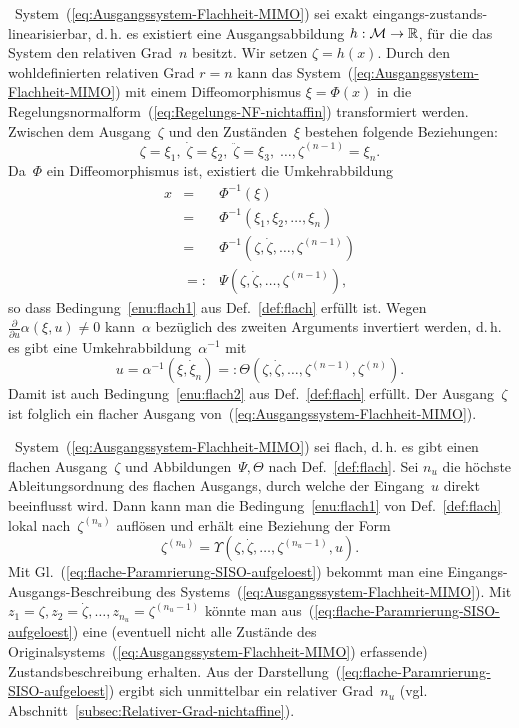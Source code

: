 \begin{svmultproof2}
\notwendig\ System~(\ref{eq:Ausgangssystem-Flachheit-MIMO}) sei
exakt eingangs-zustands-linearisierbar, d.\,h. es existiert eine
Ausgangsabbildung $h:\mathcal{M}\to{\mathbb{R}}$, für die das System den relativen
Grad~$n$ besitzt. Wir setzen $\zeta=h(x)$. Durch den wohldefinierten
relativen Grad $r=n$ kann das System~(\ref{eq:Ausgangssystem-Flachheit-MIMO})
mit einem Diffeomorphismus $\xi=\Phi(x)$ in die Regelungsnormalform~(\ref{eq:Regelungs-NF-nichtaffin})
transformiert werden. Zwischen dem Ausgang~$\zeta$ und den Zuständen~$\xi$
bestehen folgende Beziehungen:
\[
\zeta=\xi_{1},\;\dot{\zeta}=\xi_{2},\;\ddot{\zeta}=\xi_{3},\;\ldots,\zeta^{(n-1)}=\xi_{n}.
\]
Da~$\Phi$ ein Diffeomorphismus ist, existiert die Umkehrabbildung
\[
\begin{array}{lll}
x & = & \Phi^{-1}(\xi)\\
 & = & \Phi^{-1}(\xi_{1},\xi_{2},\ldots,\xi_{n})\\
 & = & \Phi^{-1}(\zeta,\dot{\zeta},\ldots,\zeta^{(n-1)})\\
 & =: & \Psi(\zeta,\dot{\zeta},\ldots,\zeta^{(n-1)}),
\end{array}
\]
so dass Bedingung~\ref{enu:flach1} aus Def.~\ref{def:flach} erfüllt
ist. Wegen $\tfrac{\partial}{\partial u}\alpha(\xi,u)\neq0$ kann~$\alpha$
bezüglich des zweiten Arguments invertiert werden, d.\,h. es gibt
eine Umkehrabbildung~$\alpha^{-1}$ mit 
\[
u=\alpha^{-1}(\xi,\dot{\xi}_{n})=:\Theta(\zeta,\dot{\zeta},\ldots,\zeta^{(n-1)},\zeta^{(n)}).
\]
Damit ist auch Bedingung~\ref{enu:flach2} aus Def.~\ref{def:flach}
erfüllt. Der Ausgang~$\zeta$ ist folglich ein flacher Ausgang von~(\ref{eq:Ausgangssystem-Flachheit-MIMO}).

\hinreichend\ System~(\ref{eq:Ausgangssystem-Flachheit-MIMO}) sei
flach, d.\,h. es gibt einen flachen Ausgang~$\zeta$ und Abbildungen~$\Psi,\Theta$
nach Def.~\ref{def:flach}. Sei $n_{u}$ die höchste Ableitungsordnung
des flachen Ausgangs, durch welche der Eingang~$u$ direkt beeinflusst
wird. Dann kann man die Bedingung~\ref{enu:flach1} von Def.~\ref{def:flach}
lokal nach~$\zeta^{(n_{u})}$ auflösen und erhält eine Beziehung
der Form
\begin{equation}
\zeta^{(n_{u})}=\varUpsilon\left(\zeta,\dot{\zeta},\ldots,\zeta^{(n_{u}-1)},u\right).\label{eq:flache-Paramrierung-SISO-aufgeloest}
\end{equation}
Mit Gl.~(\ref{eq:flache-Paramrierung-SISO-aufgeloest}) bekommt man
eine Eingangs-Ausgangs-Beschreibung des Systems~(\ref{eq:Ausgangssystem-Flachheit-MIMO}).
Mit $z_{1}=\zeta,z_{2}=\dot{\zeta},\ldots,z_{n_{u}}=\zeta^{(n_{u}-1)}$
könnte man aus~(\ref{eq:flache-Paramrierung-SISO-aufgeloest}) eine
(eventuell nicht alle Zustände des Originalsystems~(\ref{eq:Ausgangssystem-Flachheit-MIMO})
erfassende) Zustandsbeschreibung erhalten. Aus der Darstellung~(\ref{eq:flache-Paramrierung-SISO-aufgeloest})
ergibt sich unmittelbar ein relativer Grad~$n_{u}$ (vgl. Abschnitt~\ref{subsec:Relativer-Grad-nichtaffine}).


\end{svmultproof2}
